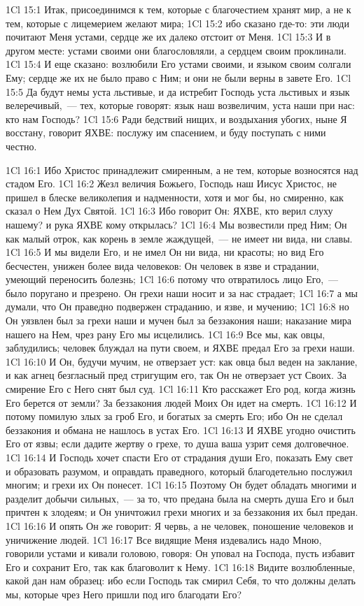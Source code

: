 \vs 1Cl 15:1
Итак, присоединимся к
тем, которые с благочестием хранят мир, а не к тем, которые с лицемерием
желают мира;
\vs 1Cl 15:2
ибо сказано где-то: эти
люди почитают Меня устами, сердце же их далеко отстоит от Меня.
\vs 1Cl 15:3
И в другом месте: устами
своими они благословляли, а сердцем своим проклинали.
\vs 1Cl 15:4
И еще сказано: возлюбили
Его устами своими, и языком своим солгали Ему; сердце же их не было право с
Ним; и они не были верны в завете Его.
\vs 1Cl 15:5
Да будут немы уста
льстивые, и да истребит Господь уста льстивых и язык велеречивый,~--- тех,
которые говорят: язык наш возвеличим, уста наши при нас: кто нам Господь?
\vs 1Cl 15:6
Ради бедствий нищих, и
воздыхания убогих, ныне Я восстану, говорит ЯХВЕ: послужу им спасением, и буду
поступать с ними честно.

\vs 1Cl 16:1
Ибо Христос принадлежит
смиренным, а не тем, которые возносятся над стадом Его.
\vs 1Cl 16:2
Жезл величия Божьего,
Господь наш Иисус Христос, не пришел в блеске великолепия и надменности, хотя
и мог бы, но смиренно, как сказал о Нем Дух Святой.
\vs 1Cl 16:3
Ибо говорит Он: ЯХВЕ, кто
верил слуху нашему? и рука ЯХВЕ кому открылась?
\vs 1Cl 16:4
Мы возвестили пред Ним; Он
как малый отрок, как корень в земле жаждущей,~--- не имеет ни вида, ни славы.
\vs 1Cl 16:5
И мы видели Его, и не имел
Он ни вида, ни красоты; но вид Его бесчестен, унижен более вида человеков: Он
человек в язве и страдании, умеющий переносить болезнь;
\vs 1Cl 16:6
потому что отвратилось
лицо Его,~--- было поругано и презрено. Он грехи наши носит и за нас страдает;
\vs 1Cl 16:7
а мы думали, что Он
праведно подвержен страданию, и язве, и мучению;
\vs 1Cl 16:8
но Он уязвлен был за грехи
наши и мучен был за беззакония наши; наказание мира нашего на Нем, чрез рану
Его мы исцелились.
\vs 1Cl 16:9
Все мы, как овцы,
заблудились; человек блуждал на пути своем, и ЯХВЕ предал Его за грехи наши.
\vs 1Cl 16:10
И Он, будучи мучим, не
отверзает уст: как овца был веден на заклание, и как агнец безгласный пред
стригущим его, так Он не отверзает уст Своих. За смирение Его с Него снят был
суд.
\vs 1Cl 16:11
Кто расскажет Его род,
когда жизнь Его берется от земли? За беззакония людей Моих Он идет на смерть.
\vs 1Cl 16:12
И потому помилую злых за
гроб Его, и богатых за смерть Его; ибо Он не сделал беззакония и обмана не
нашлось в устах Его.
\vs 1Cl 16:13
И ЯХВЕ угодно очистить
Его от язвы; если дадите жертву о грехе, то душа ваша узрит семя долговечное.
\vs 1Cl 16:14
И Господь хочет спасти
Его от страдания души Его, показать Ему свет и образовать разумом, и оправдать
праведного, который благодетельно послужил многим; и грехи их Он понесет.
\vs 1Cl 16:15
Поэтому Он будет обладать
многими и разделит добычи сильных,~--- за то, что предана была на смерть душа
Его и был причтен к злодеям; и Он уничтожил грехи многих и за беззакония их
был предан.
\vs 1Cl 16:16
И опять Он же говорит: Я
червь, а не человек, поношение человеков и уничижение людей.
\vs 1Cl 16:17
Все видящие Меня
издевались надо Мною, говорили устами и кивали головою, говоря: Он уповал на
Господа, пусть избавит Его и сохранит Его, так как благоволит к Нему.
\vs 1Cl 16:18
Видите возлюбленные,
какой дан нам образец: ибо если Господь так смирил Себя, то что должны делать
мы, которые чрез Него пришли под иго благодати Его?

